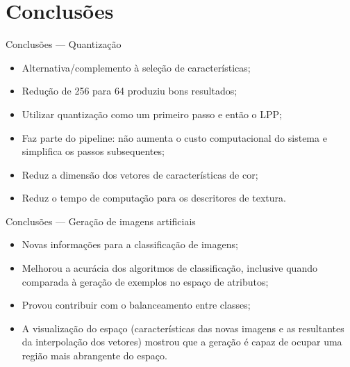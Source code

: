 \documentclass[10pt]{beamer}
\begin{document}
\section{Conclusões}
\begin{frame}{Conclusões --- Quantização}
  \setlength\leftmargini{1em}
  \begin{itemize}
    \item Alternativa/complemento à seleção de características;
    \item Redução de 256 para 64 produziu bons resultados;
    \item Utilizar quantização como um primeiro passo e então o LPP;
    \item Faz parte do pipeline: não aumenta o custo computacional do sistema e simplifica os passos subsequentes;
    \item Reduz a dimensão dos vetores de características de cor;
    \item Reduz o tempo de computação para os descritores de textura.
  \end{itemize}
\end{frame}
\begin{frame}{Conclusões --- Geração de imagens artificiais}
  \setlength\leftmargini{1em}
  \begin{itemize}
    \item Novas informações para a classificação de imagens;
    \item Melhorou a acurácia dos algoritmos de classificação, inclusive quando comparada à geração de exemplos no espaço de atributos;
    \item Provou contribuir com o balanceamento entre classes;
    \item A visualização do espaço (características das novas imagens e as resultantes da interpolação dos vetores) mostrou que a geração é capaz de ocupar uma região mais abrangente do espaço.
  \end{itemize}
\end{frame}
\end{document}
